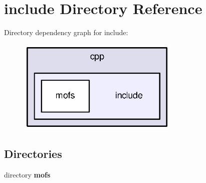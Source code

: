 \section{include Directory Reference}
\label{dir_608f2e8c297dcd7d319aee4888f86333}
Directory dependency graph for include\-:\nopagebreak
\begin{figure}[H]
\begin{center}
\leavevmode
\includegraphics[width=218pt]{dir_608f2e8c297dcd7d319aee4888f86333_dep}
\end{center}
\end{figure}
\subsection*{Directories}
\begin{DoxyCompactItemize}
\item 
directory {\bf mofs}
\end{DoxyCompactItemize}
